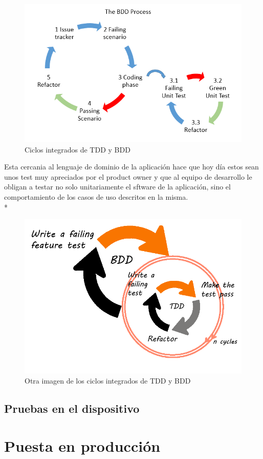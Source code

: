 \documentclass[../pfc.tex]{subfiles}
\begin{document}
		\begin{figure}[H]
			\centering
			\includegraphics[width=1\linewidth]{../images/bdd1}
			\caption{Ciclos integrados de TDD y BDD }
			\label{fig:Ciclo de BDD y TDD}
		\end{figure}
	
	Esta cercania al lenguaje de dominio de la aplicación hace que hoy día estos sean unos test muy apreciados por el product owner y que al equipo de desarrollo le obligan a testar no solo unitariamente el sftware de la aplicación, sino el comportamiento de los casos de uso descritos en la misma.\\* 
	
	\begin{figure}[H]
		\centering
		\includegraphics[width=1\linewidth]{../images/bdd2}
		\caption{Otra imagen de los ciclos integrados de TDD y BDD }
		\label{fig:Ciclo de BDD y TDD otro ejemplo}
	\end{figure}
		
	\subsection{Pruebas en el dispositivo}
	
	\section{Puesta en producción}
	
\end{document}

